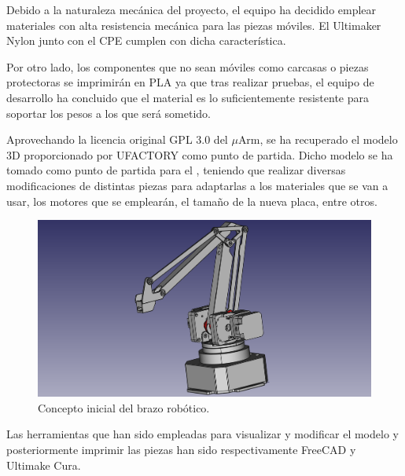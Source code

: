 Debido a la naturaleza mecánica del proyecto, el equipo ha decidido emplear materiales con alta resistencia mecánica para las piezas móviles. El Ultimaker Nylon junto con el CPE cumplen con dicha característica.

Por otro lado, los componentes que no sean móviles como carcasas o  
piezas protectoras se imprimirán en PLA ya que tras realizar pruebas, el equipo de desarrollo ha concluido que el material es lo suficientemente resistente para soportar los pesos a los que será sometido.

Aprovechando la licencia original GPL 3.0 del $\mu$Arm, se ha recuperado el modelo 3D proporcionado por UFACTORY como punto de partida. 
Dicho modelo se ha tomado como punto de partida para el \pArm{}, teniendo que realizar diversas
modificaciones de distintas piezas para adaptarlas a los materiales que se van a usar,
los motores que se emplearán, el tamaño de la nueva placa, entre otros.

\begin{figure}[H]
    \centering
    \includegraphics[width=.8\linewidth]{pictures/brazo_vista_3d_inicial.png}
    \caption{Concepto inicial del brazo robótico.}
    \label{fig:manipulador_inicial}
\end{figure}

Las herramientas que han sido empleadas para visualizar y modificar el modelo y posteriormente imprimir las piezas han sido respectivamente FreeCAD y Ultimake Cura.

